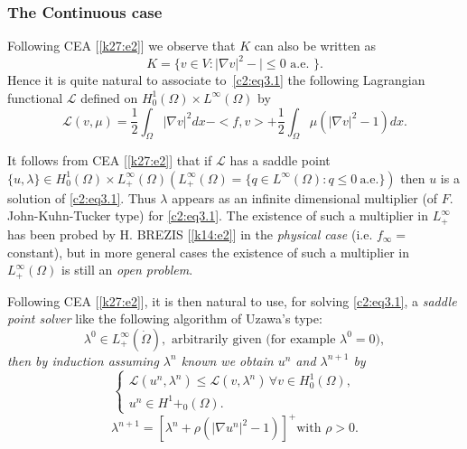 \subsubsection{The Continuous case}\label{c2:sss3.8.1}%

Following CEA [\ref{k27:e2}]  we observe that $K$ can also be written as 
$$
K= \{v \in V : | \nabla v|^2 -| \leq 0 \text{ a.e. } \}. 
$$
Hence it is quite natural to associate to~\ref{c2:eq3.1} the following 
Lagrangian functional $\mathscr{L}$ defined on $H^1_0 (\Omega) \times 
L^\infty (\Omega)$ by  
$$
\mathscr{L} (v, \mu) =\frac{1}{2}\int_\Omega |\nabla v|^2 dx -
< f, v> + \frac{1}{2} \int_\Omega \mu (| \nabla v|^2 -1) dx . 
$$

It follows from CEA [\ref{k27:e2}] that  if $\mathscr{L}$ has a  saddle point
$\{u, \lambda\}\in H^1_0 (\Omega) \times L^\infty_+ (\Omega)
(L^\infty_+ (\Omega) = \{q \in L^\infty (\Omega) : q \leq 0
~\text{a.e.}\})$  then $u$ is a solution of \eqref{c2:eq3.1}. Thus $\lambda$ appears as
an infinite dimensional  multiplier (of $F$. John-Kuhn-Tucker type)
for \eqref{c2:eq3.1}. The existence of such a multiplier in $L^\infty_+$ has been
probed by H. BREZIS [\ref{k14:e2}] in the \textit{physical case} (i.e. $f_\infty
=$ constant), but in more general cases the existence of such a
multiplier in $L^\infty _+ (\Omega)$ is still an \textit{open
  problem}.  

Following CEA [\ref{k27:e2}], it is then natural to use, for solving
\eqref{c2:eq3.1}, a \textit{saddle point solver} like the following
algorithm of Uzawa's type: 
\begin{equation}
\lambda^0 \in L^\infty_+ (\dot{\Omega}), \text{ arbitrarily
  given  (for example } \lambda^0 = 0), \tag{3.63}\label{c2:eq3.63} 
\end{equation}
\textit{then by induction assuming $\lambda^n$ known we obtain $u^n$
  and $\lambda^{n+1}$ by} 
\begin{equation}
\begin{cases}
\mathscr{L} (u^n, \lambda^n) \leq \mathscr{L} (v,\lambda^n)\, \forall  v
\in H^1_0 (\Omega),\\ 
u^n \in H^1+_0 (\Omega). \tag{3.64}\label{c2:eq3.64}
\end{cases}
\end{equation}\pageoriginale 
\begin{equation}
\lambda^{n+1} = [\lambda^n + \rho (|\nabla u^n|^2 -1)]^+ \text{
  with }\rho > 0 . \tag{3.65}\label{c2:eq3.65} 
\end{equation}

